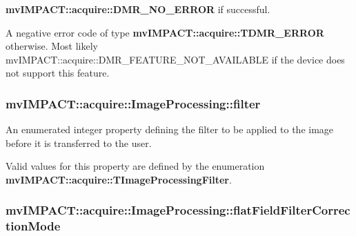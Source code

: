 \begin{DoxyItemize}
\item {\bfseries mv\+I\+M\+P\+A\+C\+T\+::acquire\+::\+D\+M\+R\+\_\+\+N\+O\+\_\+\+E\+R\+R\+O\+R} if successful.
\item A negative error code of type {\bfseries mv\+I\+M\+P\+A\+C\+T\+::acquire\+::\+T\+D\+M\+R\+\_\+\+E\+R\+R\+O\+R} otherwise. Most likely mv\+I\+M\+P\+A\+C\+T\+::acquire\+::\+D\+M\+R\+\_\+\+F\+E\+A\+T\+U\+R\+E\+\_\+\+N\+O\+T\+\_\+\+A\+V\+A\+I\+L\+A\+B\+L\+E if the device does not support this feature. 
\end{DoxyItemize}\hypertarget{classmv_i_m_p_a_c_t_1_1acquire_1_1_image_processing_a5ccbcb292285fef63f625b25239c4164}{
\subsubsection[{filter}]{ mv\+I\+M\+P\+A\+C\+T\+::acquire\+::\+Image\+Processing\+::filter}}\label{classmv_i_m_p_a_c_t_1_1acquire_1_1_image_processing_a5ccbcb292285fef63f625b25239c4164}


An enumerated integer property defining the filter to be applied to the image before it is transferred to the user. 

Valid values for this property are defined by the enumeration {\bfseries mv\+I\+M\+P\+A\+C\+T\+::acquire\+::\+T\+Image\+Processing\+Filter}. \hypertarget{classmv_i_m_p_a_c_t_1_1acquire_1_1_image_processing_ae6922326134aec43993be0e07d4c5f76}{
\subsubsection[{flat\+Field\+Filter\+Correction\+Mode}]{ mv\+I\+M\+P\+A\+C\+T\+::acquire\+::\+Image\+Processing\+::flat\+Field\+Filter\+Correction\+Mode}}\label{classmv_i_m_p_a_c_t_1_1acquire_1_1_image_processing_ae6922326134aec43993be0e07d4c5f76}


